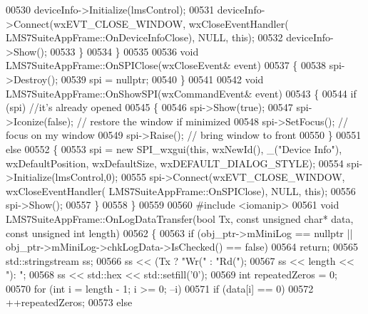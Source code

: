 \begin{DoxyCode}
{{{{00530         deviceInfo->Initialize(lmsControl);
00531         deviceInfo->Connect(wxEVT\_CLOSE\_WINDOW, wxCloseEventHandler(
      LMS7SuiteAppFrame::OnDeviceInfoClose), NULL, \textcolor{keyword}{this});
00532         deviceInfo->Show();
00533     \}
00534 \}
00535 
00536 \textcolor{keywordtype}{void} LMS7SuiteAppFrame::OnSPIClose(wxCloseEvent& event)
00537 \{
00538     spi->Destroy();
00539     spi = \textcolor{keyword}{nullptr};
00540 \}
00541 
00542 \textcolor{keywordtype}{void} LMS7SuiteAppFrame::OnShowSPI(wxCommandEvent& event)
00543 \{
00544     \textcolor{keywordflow}{if} (spi) \textcolor{comment}{//it's already opened}
00545     \{
00546         spi->Show(\textcolor{keyword}{true});
00547         spi->Iconize(\textcolor{keyword}{false}); \textcolor{comment}{// restore the window if minimized}
00548         spi->SetFocus();  \textcolor{comment}{// focus on my window}
00549         spi->Raise();  \textcolor{comment}{// bring window to front}
00550     \}
00551     \textcolor{keywordflow}{else}
00552     \{
00553         spi = \textcolor{keyword}{new} SPI_wxgui(\textcolor{keyword}{this}, wxNewId(), \_(\textcolor{stringliteral}{"Device Info"}), wxDefaultPosition, wxDefaultSize, 
      wxDEFAULT\_DIALOG\_STYLE);
00554         spi->Initialize(lmsControl,0);
00555         spi->Connect(wxEVT\_CLOSE\_WINDOW, wxCloseEventHandler(
      LMS7SuiteAppFrame::OnSPIClose), NULL, \textcolor{keyword}{this});
00556         spi->Show();
00557     \}
00558 \}
00559 
00560 \textcolor{preprocessor}{#include <iomanip>}
00561 \textcolor{keywordtype}{void} LMS7SuiteAppFrame::OnLogDataTransfer(\textcolor{keywordtype}{bool} Tx, \textcolor{keyword}{const} \textcolor{keywordtype}{unsigned} \textcolor{keywordtype}{char}* data, \textcolor{keyword}{const} \textcolor{keywordtype}{unsigned} \textcolor{keywordtype}{int} 
      length)
00562 \{
00563     \textcolor{keywordflow}{if} (obj_ptr->mMiniLog == \textcolor{keyword}{nullptr} || obj_ptr->mMiniLog->chkLogData->IsChecked() == \textcolor{keyword}{false})
00564         \textcolor{keywordflow}{return};
00565     std::stringstream ss;
00566     ss << (Tx ? \textcolor{stringliteral}{"Wr("} : \textcolor{stringliteral}{"Rd("});
00567     ss << length << \textcolor{stringliteral}{"): "};
00568     ss << std::hex << std::setfill(\textcolor{charliteral}{'0'});
00569     \textcolor{keywordtype}{int} repeatedZeros = 0;
00570     \textcolor{keywordflow}{for} (\textcolor{keywordtype}{int} i = length - 1; i >= 0; --i)
00571         \textcolor{keywordflow}{if} (data[i] == 0)
00572             ++repeatedZeros;
00573         \textcolor{keywordflow}{else}
}}}}
\end{DoxyCode}
